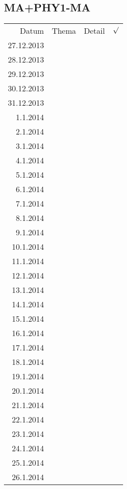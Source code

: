 \subsection{MA+PHY1-MA}
\begin{tabular}{r l p{} l}
\rowcolor{lgray} Datum       & Thema         & Detail & $\surd$ \\
\rowcolor{white}  27.12.2013 &               &  &  \\
\rowcolor{lgray}  28.12.2013 &               &  &  \\
\rowcolor{white}  29.12.2013 &               &  &  \\
\rowcolor{lgray}  30.12.2013 &               &  &  \\
\rowcolor{white}  31.12.2013 &               &  &  \\
\rowcolor{lgray}    1.1.2014 &               &  &  \\
\rowcolor{white}    2.1.2014 &               &  &  \\
\rowcolor{lgray}    3.1.2014 &               &  &  \\
\rowcolor{white}    4.1.2014 &               &  &  \\
\rowcolor{lgray}    5.1.2014 &               &  &  \\
\rowcolor{white}    6.1.2014 &               &  &  \\
\rowcolor{lgray}    7.1.2014 &               &  &  \\
\rowcolor{white}    8.1.2014 &               &  &  \\
\rowcolor{lgray}    9.1.2014 &               &  &  \\
\rowcolor{white}   10.1.2014 &               &  &  \\
\rowcolor{lgray}   11.1.2014 &               &  &  \\
\rowcolor{white}   12.1.2014 &               &  &  \\
\rowcolor{lgray}   13.1.2014 &               &  &  \\
\rowcolor{white}   14.1.2014 &               &  &  \\
\rowcolor{lgray}   15.1.2014 &               &  &  \\
\rowcolor{white}   16.1.2014 &               &  &  \\
\rowcolor{lgray}   17.1.2014 &               &  &  \\
\rowcolor{white}   18.1.2014 &               &  &  \\
\rowcolor{lgray}   19.1.2014 &               &  &  \\
\rowcolor{white}   20.1.2014 &               &  &  \\
\rowcolor{lgray}   21.1.2014 &               &  &  \\
\rowcolor{white}   22.1.2014 &               &  &  \\
\rowcolor{lgray}   23.1.2014 &               &  &  \\
\rowcolor{white}   24.1.2014 &               &  &  \\
\rowcolor{lgray}   25.1.2014 &               &  &  \\
\rowcolor{white}   26.1.2014 &               &  &  \\
\end{tabular}

